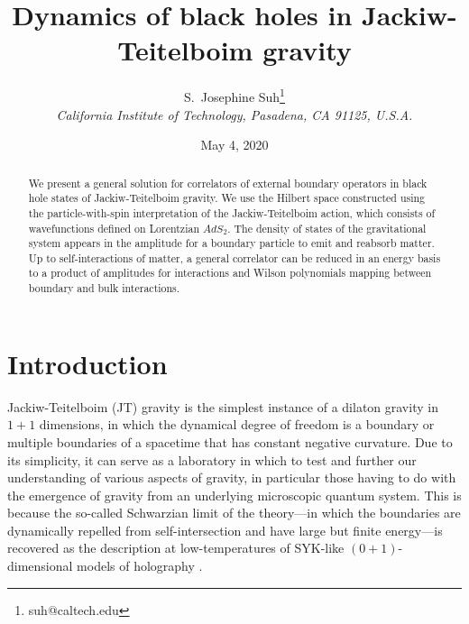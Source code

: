\documentclass[12pt]{article}
\title {Dynamics of black holes in Jackiw-Teitelboim gravity}
\author{S.\ Josephine Suh\footnote{suh@caltech.edu}\\
\normalsize\it California Institute of Technology, Pasadena, CA 91125, U.S.A.\vspace{0.5cm}}
\date{May 4, 2020}
\DeclareMathOperator{\AdS}{AdS}
\def\AdS{AdS}
\begin{document}
\setcounter{tocdepth}{2}

\maketitle
\thispagestyle{empty}

\begin{abstract}
We present a general solution for correlators of external boundary operators in black hole states of Jackiw-Teitelboim gravity. We use the Hilbert space constructed using the particle-with-spin interpretation of the Jackiw-Teitelboim action, which consists of wavefunctions defined on Lorentzian $\AdS_2$. The density of states of the gravitational system appears in the amplitude for a boundary particle to emit and reabsorb matter. Up to self-interactions of matter, a general correlator can be reduced in an energy basis to a product of amplitudes for interactions and Wilson polynomials mapping between boundary and bulk interactions. 

\end{abstract}


\newpage
{}
\tableofcontents

\section{Introduction}

Jackiw-Teitelboim (JT) gravity \cite{Ja85, Te83, AlPo14} is the simplest instance of a dilaton gravity in $1+1$ dimensions, in which the dynamical degree of freedom is a boundary or multiple boundaries of a spacetime that has constant negative curvature. Due to its simplicity, it can serve as a laboratory in which to test and further our understanding of various aspects of gravity, in particular those having to do with the emergence of gravity from an underlying microscopic quantum system. This is because the so-called Schwarzian limit of the theory---in which the boundaries are dynamically repelled from self-intersection and have large but finite energy---is recovered as the description at low-temperatures of SYK-like $(0+1)$-dimensional models of holography \cite{SaYe93,Kit.KITP,SoftMode}.
\end{document}
